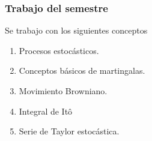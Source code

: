\begin{bibunit}[apalike] 
  \begin{frame}
    \frametitle{Trabajo del semestre}
    \begin{alertblock}{Se trabajo con los siguientes conceptos}
      \begin{enumerate}
        \item
          Procesos estocásticos. \cite{Rincn10}
        \item
          Conceptos básicos de martingalas.
        \item
          Movimiento Browniano.
        \item
          Integral de It\^o
        \item
          Serie de Taylor estocástica. \cite{KloedenPllaten}
      \end{enumerate}
    \end{alertblock}
  \end{frame}
\end{bibunit}
